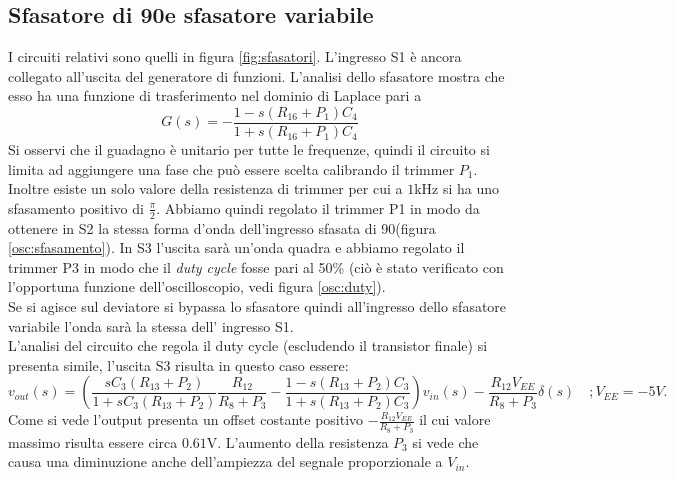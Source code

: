 \documentclass[10pt,a4paper]{article}
\begin{document}
\newpage

\subsection{Sfasatore di 90\degree e sfasatore variabile}
I circuiti relativi sono quelli in figura \ref{fig:sfasatori}. L'ingresso S1 è ancora collegato all'uscita del generatore di funzioni.
L'analisi dello sfasatore mostra che esso ha una funzione di trasferimento nel dominio di Laplace pari a
\begin{equation}
 G(s) = -\frac{1-s(R_{16} +P_1) C_{4}}{1+s(R_{16} + P_1)C_{4}}
\end{equation}
Si osservi che il guadagno è unitario per tutte le frequenze, quindi il circuito si limita ad aggiungere una fase che può essere scelta calibrando il trimmer $P_1$. Inoltre esiste un solo valore della resistenza di trimmer per cui a $1$kHz si ha uno sfasamento positivo di $\frac{\pi}{2}$. Abbiamo quindi regolato il trimmer P1 in modo da ottenere in S2 la stessa forma d'onda dell'ingresso sfasata di 90\degree (figura \ref{osc:sfasamento}). In S3 l'uscita sarà un'onda quadra e abbiamo regolato il trimmer P3 in modo che il \emph{duty cycle} fosse pari al 50\% (ciò è stato verificato con l'opportuna funzione dell'oscilloscopio, vedi figura \ref{osc:duty}).\\
Se si agisce sul deviatore si bypassa lo sfasatore quindi all'ingresso dello sfasatore variabile l'onda sarà la stessa dell' ingresso S1.\\
L'analisi del circuito che regola il duty cycle (escludendo il transistor finale) si presenta simile, l'uscita S3 risulta in questo caso essere:
\begin{equation}
v_{out}(s) = \left( \frac{s C_3 (R_{13} + P_2)}{1 + s C_3 (R_{13} + P_2)} \frac{R_{12}}{R_8+P_3} -\frac{1-s(R_{13} +P_2) C_{3}}{1+s(R_{13} + P_2)C_{3}} \right) v_{in}(s)-\frac{R_{12} V_{EE}}{R_8+P_3} \delta (s)
\, \, \, \, \, \, ; V_{EE} = -5V.
\end{equation}
Come si vede l'output presenta un offset costante positivo $-\frac{R_{12} V_{EE}}{R_8+P_3}$ il cui valore massimo risulta essere circa $0.61$V. L'aumento della resistenza $P_3$ si vede che causa una diminuzione anche dell'ampiezza del segnale proporzionale a $V_{in}$. 
\end{document}

